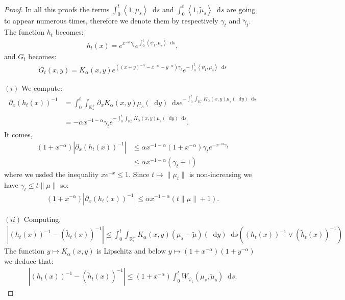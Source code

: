 \documentclass[11pt,a4paper]{article}
\newcommand{\RRP}{\mathbb{R}^+_*}
\newcommand{\brac}[1]{\left\langle#1\right\rangle}
\newcommand{\dd}{\mathop{}\!\mathrm{d}}
\begin{document}
\begin{proof}
    In all this proofs the terms $\int_0^t \brac{1,\mu_s}\dd s$ and $\int_0^t \brac{1,\tilde{\mu}_s}\dd s$ are going to appear numerous times, therefore we denote them by respectively $\gamma_t$ and $\tilde{\gamma}_t$. The function $h_t$ becomes:
    \begin{align*}
        h_t(x) = e^{x^{-\alpha} \gamma_t} e^{\int_0^t \brac{\psi_1,\mu_s} \dd s},
    \end{align*}
    and $G_t$ becomes:
    \begin{align*}
        G_t(x,y) = K_\alpha(x,y) e^{\left((x+y)^{-\alpha} - x^{-\alpha} - y^{-\alpha}\right)\gamma_t} e^{-\int_0^t \brac{\psi_1,\mu_s} \dd s}
    \end{align*}

    $(i)$ We compute:
    \begin{align*}
        \partial_x \left( h_t(x)\right)^{-1} &= \int_0^t \int_{\RRP} \partial_x K_\alpha(x,y) \mu_s(\dd y) \dd s e^{-\int_0^t \int_{\RRP} K_\alpha(x,y) \mu_s(\dd y) \dd s} \\
        &= -\alpha x^{-1-\alpha} \gamma_t e^{-\int_0^t \int_{\RRP} K_\alpha(x,y) \mu_s(\dd y) \dd s}.
    \end{align*}
    It comes,
    \begin{align*} 
        (1 + x^{-\alpha})\left|\partial_x \left( h_t(x)\right)^{-1}\right| &\leq \alpha x^{-1-\alpha} (1 + x^{-\alpha})  \gamma_t e^{-x^{-\alpha} \gamma_t}\\
        &\leq \alpha x^{-1-\alpha}(\gamma_t +1)
    \end{align*}
    where we usded the inequality $xe^{-x} \leq 1$. Since $t\mapsto \| \mu_t\|$ is non-increasing we have $\gamma_t \leq t\|\mu\|$ so:
    \begin{align*}
        (1 + x^{-\alpha})\left|\partial_x \left( h_t(x)\right)^{-1}\right|  \leq \alpha x^{-1-\alpha} \left(t\|\mu\| + 1\right).
    \end{align*}

    $(ii)$ Computing,
    \begin{align*}
        \left|\left( h_t(x)\right)^{-1}-\left( \tilde{h}_t(x)\right)^{-1} \right| \leq \int_0^t \int_{\RRP} K_\alpha(x,y) \left(\mu_s - \tilde{\mu}\right)(\dd y) \dd s \left(\left( h_t(x)\right)^{-1} \vee \left( \tilde{h}_t(x)\right)^{-1} \right) 
    \end{align*}
    The function $y \mapsto K_\alpha(x,y)$ is Lipschitz and below $y \mapsto (1 + x^{-\alpha})(1 + y^{-\alpha})$ we deduce that:
    \begin{align*}
        \left|\left( h_t(x)\right)^{-1}-\left( \tilde{h}_t(x)\right)^{-1} \right| \leq (1 + x^{-\alpha})\int_0^t W_{\psi_1} (\mu_s,\tilde{\mu}_s)\dd s.
    \end{align*} 


\end{proof}
\end{document}
